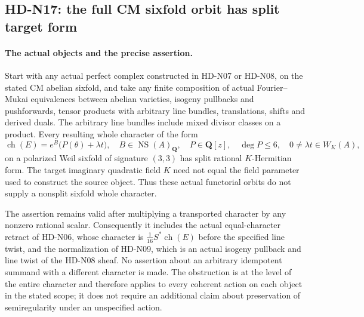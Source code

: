 \subsection{HD-N17: the full CM sixfold orbit has split target form}
\label{sec:HD-N17}

\paragraph{The actual objects and the precise assertion.}
Start with any actual perfect complex constructed in HD-N07 or
HD-N08, on the stated CM abelian sixfold, and take any finite
composition of actual Fourier--Mukai equivalences between abelian
varieties, isogeny pullbacks and pushforwards, tensor products with
arbitrary line bundles, translations, shifts and derived duals.
The arbitrary line bundles include mixed divisor classes on a product.
Every resulting whole character of the form
\begin{equation}
 \operatorname{ch}(E)=e^B\bigl(P(\theta)+\lambda t\bigr),
 \quad B\in\operatorname{NS}(A)_{\mathbf Q},\quad
 P\in\mathbf Q[z],\quad \deg P\leq6,
 \quad0\ne\lambda t\in W_K(A),                       \tag{N17.1}
\end{equation}
on a polarized Weil sixfold of signature $(3,3)$ has split
rational $K$-Hermitian form. The target imaginary quadratic
field $K$ need not equal the field parameter used to construct
the source object. Thus these actual functorial orbits do not
supply a nonsplit sixfold whole character.

The assertion remains valid after multiplying a transported
character by any nonzero rational scalar. Consequently it includes
the actual equal-character retract of HD-N06, whose character is
$\frac1{16}S^*\operatorname{ch}(E)$ before the specified line twist,
and the normalization of HD-N09, which is an actual isogeny pullback
and line twist of the HD-N08 sheaf. No assertion about an arbitrary
idempotent summand with a different character is made. The obstruction
is at the level of the entire character and therefore applies to
every coherent action on each object in the stated scope; it does
not require an additional claim about preservation of semiregularity
under an unspecified action.

